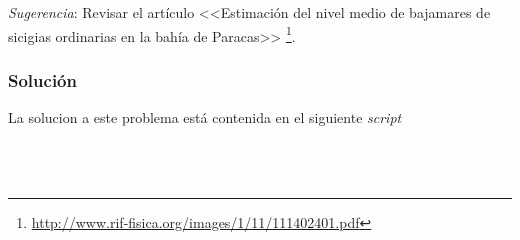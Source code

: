\documentclass[a4paper,12pt,final]{article}
\begin{document}
      \noindent \emph{Sugerencia}: Revisar el artículo <<Estimación del nivel medio de bajamares de sicigias ordinarias en la bahía de Paracas>>
      \footnote{\url{http://www.rif-fisica.org/images/1/11/111402401.pdf}}.

    \subsubsection*{Solución}
      \noindent La solucion a este problema está contenida en el siguiente \emph{script}
      \begin{listing}[H]
        \label{script:3.1a}
        \inputminted[lastline=29]{matlab}{./laboratorio_5/problema03.m}
      \end{listing}
      \vspace{-1em}
      \vfill

      \newpage
      \vspace{-1em}
      \begin{listing}[H]
        \label{script:3.1b}
        \inputminted[firstline=30,lastline=83]{matlab}{./laboratorio_5/problema03.m}
      \end{listing}
      \vspace{-1em}
      \vfill

      \newpage
      \vspace{-1em}
      \begin{listing}[H]
        \label{script:3.1c}
        \inputminted[firstline=85,lastline=137]{matlab}{./laboratorio_5/problema03.m}
      \end{listing}
      \vspace{-1em}
      \vfill

      \newpage
      \vspace{-1em}
      \begin{listing}[H]
        \label{script:3.1d}
        \inputminted[firstline=137]{matlab}{./laboratorio_5/problema03.m}
      \end{listing}
      \vspace{-1em}
      \vfill
\end{document}
